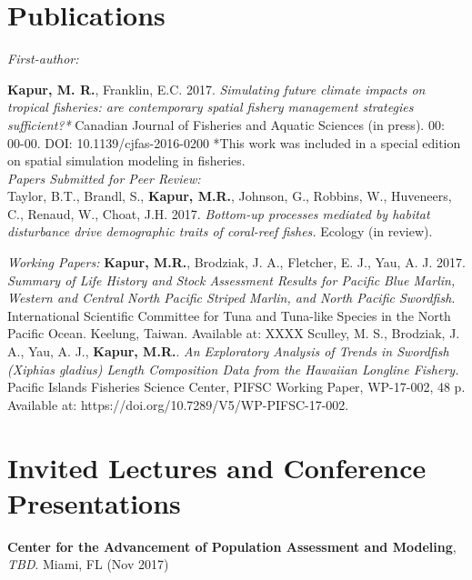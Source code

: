 \documentclass[10pt, letterpaper]{article}
\begin{document}
\section*{Publications}
\noindent \textit{First-author:}

\hangindent=0.5cm \noindent \textbf{Kapur, M. R.}, Franklin, E.C. 2017. \textit{Simulating future climate impacts on tropical fisheries: are contemporary spatial fishery management strategies sufficient?*} Canadian Journal of Fisheries and Aquatic Sciences (in press).  00: 00-00. DOI: 10.1139/cjfas-2016-0200 
*This work was included in a special edition on spatial simulation modeling in fisheries. \\

\noindent \textit{Papers Submitted for Peer Review:}\\
\hangindent=0.5cm \noindent Taylor, B.T., Brandl, S., \textbf{Kapur, M.R.},  Johnson, G., Robbins, W., Huveneers, C., Renaud, W., Choat, J.H. 2017.
\textit{Bottom-up processes mediated by habitat disturbance drive demographic traits of coral-reef fishes.} Ecology (in review).\newline

\noindent \textit{Working Papers:}\newline
\hangindent=0.5cm \noindent  \textbf{Kapur, M.R.},  Brodziak, J. A., Fletcher, E. J., Yau, A. J. 2017. \textit{Summary of Life History and Stock Assessment Results for Pacific Blue Marlin, Western and Central North Pacific Striped Marlin, and North Pacific Swordfish}. International Scientific Committee for Tuna and Tuna-like Species in the North Pacific Ocean. Keelung, Taiwan. Available at: XXXX \newline
\hangindent=0.5cm \noindent  Sculley, M. S., Brodziak, J. A., Yau, A. J., \textbf{Kapur, M.R.}.  \textit{An Exploratory Analysis of Trends in Swordfish (Xiphias gladius) Length Composition Data from the Hawaiian Longline Fishery.} Pacific Islands Fisheries Science Center, PIFSC Working Paper, WP-17-002, 48 p.  Available at: https://doi.org/10.7289/V5/WP-PIFSC-17-002. \\

\section*{Invited Lectures and Conference Presentations}

\noindent \textbf{Center for the Advancement of Population Assessment and Modeling}, \textit{TBD}. Miami, FL (Nov 2017)
\end{document}
